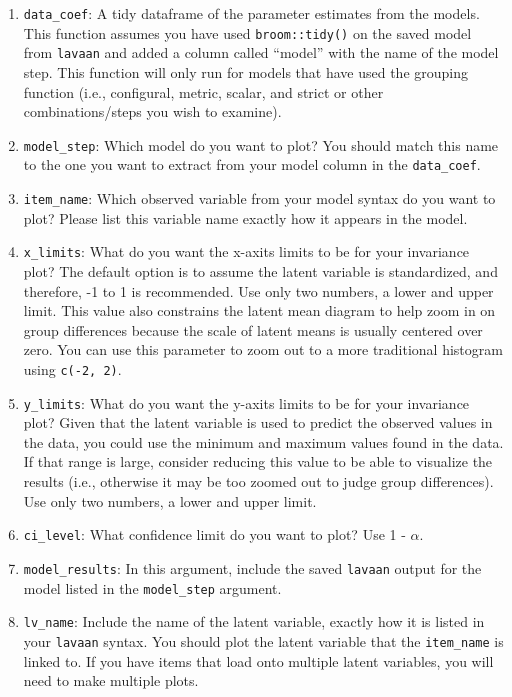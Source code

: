 \documentclass[
  man]{apa6}
\begin{document}
\begin{enumerate}
\def\labelenumi{\arabic{enumi})}
\item
  \texttt{data\_coef}: A tidy dataframe of the parameter estimates from the models. This function assumes you have used \texttt{broom::tidy()} on the saved model from \texttt{lavaan} and added a column called ``model'' with the name of the model step. This function will only run for models that have used the grouping function (i.e., configural, metric, scalar, and strict or other combinations/steps you wish to examine).
\item
  \texttt{model\_step}: Which model do you want to plot? You should match this name to the one you want to extract from your model column in the \texttt{data\_coef}.
\item
  \texttt{item\_name}: Which observed variable from your model syntax do you want to plot? Please list this variable name exactly how it appears in the model.
\item
  \texttt{x\_limits}: What do you want the x-axits limits to be for your invariance plot? The default option is to assume the latent variable is standardized, and therefore, -1 to 1 is recommended. Use only two numbers, a lower and upper limit. This value also constrains the latent mean diagram to help zoom in on group differences because the scale of latent means is usually centered over zero. You can use this parameter to zoom out to a more traditional histogram using \texttt{c(-2,\ 2)}.
\item
  \texttt{y\_limits}: What do you want the y-axits limits to be for your invariance plot? Given that the latent variable is used to predict the observed values in the data, you could use the minimum and maximum values found in the data. If that range is large, consider reducing this value to be able to visualize the results (i.e., otherwise it may be too zoomed out to judge group differences). Use only two numbers, a lower and upper limit.
\item
  \texttt{ci\_level}: What confidence limit do you want to plot? Use 1 - \(\alpha\).
\item
  \texttt{model\_results}: In this argument, include the saved \texttt{lavaan} output for the model listed in the \texttt{model\_step} argument.
\item
  \texttt{lv\_name}: Include the name of the latent variable, exactly how it is listed in your \texttt{lavaan} syntax. You should plot the latent variable that the \texttt{item\_name} is linked to. If you have items that load onto multiple latent variables, you will need to make multiple plots.
\end{enumerate}
\end{document}
